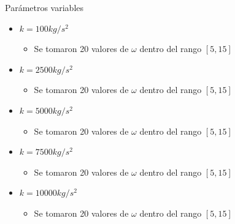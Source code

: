 \begin{frame}
    \begin{block}{Parámetros variables}
        \begin{itemize}
            \item $k=100 kg/s^2 $
                \begin{itemize}
                    \item Se tomaron 20 valores de $\omega$ dentro del rango $[5, 15]$
                \end{itemize}
            \item $k=2500 kg/s^2$
                \begin{itemize}
                    \item Se tomaron 20 valores de $\omega$ dentro del rango $[5, 15]$
                \end{itemize}
            \item $k=5000 kg/s^2$
                \begin{itemize}
                    \item Se tomaron 20 valores de $\omega$ dentro del rango $[5, 15]$
                \end{itemize}
            \item $k=7500 kg/s^2$
                \begin{itemize}
                    \item Se tomaron 20 valores de $\omega$ dentro del rango $[5, 15]$
                \end{itemize}
            \item $k=10000 kg/s^2$
                \begin{itemize}
                    \item Se tomaron 20 valores de $\omega$ dentro del rango $[5, 15]$
                \end{itemize}
        \end{itemize}
    \end{block}
\end{frame}

